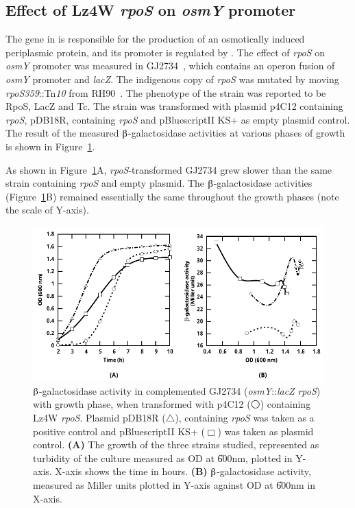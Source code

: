 \subsection{Effect of Lz4W \emph{rpoS} on \emph{osmY}
promoter}

The  gene in  is responsible for the production
of an osmotically induced periplasmic protein, and its promoter is
regulated by . The effect of \emph{rpoS} on
 \emph{osmY} promoter was measured in GJ2734~\citep[kind
gift from J Gowrishankar]{Rajkumari2001}, which contains an operon
fusion of \emph{osmY} promoter and \emph{lacZ}. The indigenous
copy of \emph{rpoS} was mutated by moving
\emph{rpoS359}::Tn\emph{10} from RH90~\citep{Barth1995}. The
phenotype of the strain was reported to be RpoS\su{$-$},
LacZ\su{$-$} and Tc. The strain was transformed with plasmid
p4C12 containing \emph{rpoS}, pDB18R, containing
\emph{rpoS} and pBluescriptII KS+ as empty plasmid
control. The result of the measured $\betaup$-galactosidase
activities at various phases of growth is shown in
Figure~\ref{chap5:osmy_growth}.

As shown in Figure~\ref{chap5:osmy_growth}A,
\emph{rpoS}-transformed GJ2734 grew slower than the same
strain containing \emph{rpoS} and empty plasmid. The
$\betaup$-galactosidase activities
(Figure~\ref{chap5:osmy_growth}B) remained essentially the same
throughout the growth phases (note the scale of Y-axis).

\begin{figure}[tbp]
\begin{narrow}{-1in}{-1in}
\centering
\includegraphics{figures/chap5_osmy_graph}
\end{narrow}
\caption[$\betaup$-galactosidase activity in complemented
GJ2734]{$\betaup$-galactosidase activity in complemented GJ2734
(\emph{osmY}::\emph{lacZ} \emph{rpoS}) with growth phase, when
transformed with p4C12 ($\medcirc$) containing Lz4W \emph{rpoS}\@.
Plasmid pDB18R ($\triangle$), containing  \emph{rpoS} was
taken as a positive control and pBluescriptII KS+ ($\Box$) was
taken as plasmid control. \textbf{(A)} The growth of the three
strains studied, represented as turbidity of the culture measured
as OD at \U{600}{nm}, plotted in Y-axis. X-axis shows the time in
hours. \textbf{(B)} $\betaup$-galactosidase activity, measured as
Miller units plotted in Y-axis against OD at \U{600}{nm} in
X-axis.} \label{chap5:osmy_growth}
\end{figure}

